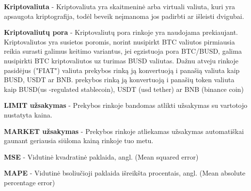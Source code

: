 \documentclass{VUMIFInfKursinis}
\begin{document}
\textbf{Kriptovaliuta} - Kriptovaliuta yra skaitmeninė arba virtuali valiuta, kuri yra apsaugota kriptografija, todėl beveik neįmanoma jos padirbti ar išleisti dvigubai.

\textbf{Kriptovaliutų pora} - Kriptovaliutų pora rinkoje yra naudojama prekiaujant. Kriptovaliutos yra susietos poromis, norint nusipirkt BTC valiutos pirmiausia reikia surasti 
galimus keitimo variantus, jei egzistuoja pora BTC/BUSD, galima nusipirkti BTC kriptovaliutos uz turimas BUSD valiutas. Dažnu atveju rinkoje pasidėjus ("FIAT") valiuta
prekybos rinką ją konvertuoją i panašią valiuta kaip BUSD, USDT ar BNB.
prekybos rinką ją konvertuoją i panašių token valiuta kaip BUSD(us -regulated stablecoin), USDT (usd tether) ar BNB (binance coin)

\textbf{LIMIT užsakymas} - Prekybos rinkoje bandomas atlikti užsakymas su vartotojo nustatyta kaina.

\textbf{MARKET užsakymas} - Prekybos rinkoje atliekamas užsakymas automatiškai gaunant geriausia siūloma kainą rinkoje tuo metu.

\textbf{MSE} - Vidutinė kvadratinė paklaida, angl. (Mean squared error)

\textbf{MAPE} - Vidutinė  bsoliučioji paklaida išreikšta procentais, angl. (Mean absolute percentage error)

\printbibliography[heading=bibintoc] %

\appendix  %
\end{document}
